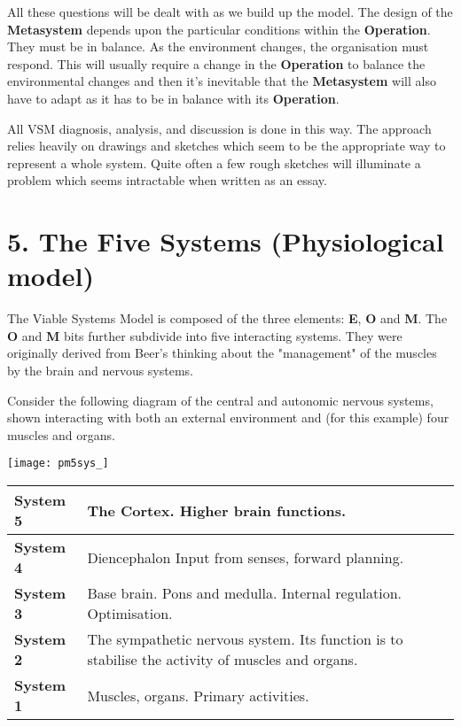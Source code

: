 All these questions will be dealt with as we build up the model. The design of the \textcolor{M}{\textbf{Metasystem}} depends upon the particular conditions within the \textcolor{O}{\textbf{Operation}}. They must be in balance. As the environment changes, the organisation must respond. This will usually require a change in the \textcolor{O}{\textbf{Operation}} to balance the environmental changes and then it's inevitable that the \textcolor{M}{\textbf{Metasystem}} will also have to adapt as it has to be in balance with its \textcolor{O}{\textbf{Operation}}.

All VSM diagnosis, analysis, and discussion is done in this way. The approach relies heavily on drawings and sketches which seem to be the appropriate way to represent a whole system. Quite often a few rough sketches will illuminate a problem which seems intractable when written as an essay.

\section*{5. The Five Systems (Physiological model)}
The Viable Systems Model is composed of the three elements: \textcolor{E}{\textbf{E}}, \textcolor{O}{\textbf{O}} and \textcolor{M}{\textbf{M}}. The \textcolor{O}{\textbf{O}} and \textcolor{M}{\textbf{M}} bits further subdivide into five interacting systems. They were originally derived from Beer's thinking about the "management" of the muscles by the brain and nervous systems.

Consider the following diagram of the central and autonomic nervous systems, shown interacting with both an external environment and (for this example) four muscles and organs.

\begin{center}
	\texttt{[image: pm5sys\_]}
\end{center}

{\renewcommand{\arraystretch}{1.5} %
\begin{tabular}{ | p{} | p{} | }
	\hline
	\textbf{System 5} & The Cortex. Higher brain functions. \\
	\hline
	\textbf{System 4} & Diencephalon Input from senses, forward planning. \\
	\hline
	\textbf{System 3} & Base brain. Pons and medulla. Internal regulation. Optimisation. \\
	\hline
	\textbf{System 2} & The sympathetic nervous system. Its function is to stabilise the activity of muscles and organs. \\
	\hline
	\textbf{System 1} & Muscles, organs. Primary activities. \\
	\hline
\end{tabular}
}

